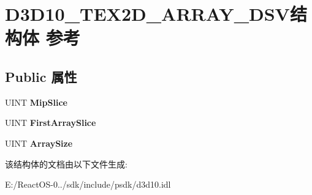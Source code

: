 \hypertarget{struct_d3_d10___t_e_x2_d___a_r_r_a_y___d_s_v}{}\section{D3\+D10\+\_\+\+T\+E\+X2\+D\+\_\+\+A\+R\+R\+A\+Y\+\_\+\+D\+S\+V结构体 参考}
\label{struct_d3_d10___t_e_x2_d___a_r_r_a_y___d_s_v}
\subsection*{Public 属性}
\begin{DoxyCompactItemize}
\item 
\mbox{\label{struct_d3_d10___t_e_x2_d___a_r_r_a_y___d_s_v_a891bd72fda2b4406118d3fc9b1de26d7}} 
U\+I\+NT {\bfseries Mip\+Slice}
\item 
\mbox{\label{struct_d3_d10___t_e_x2_d___a_r_r_a_y___d_s_v_a4c6f72c108f9551a0f9860fd73bb355a}} 
U\+I\+NT {\bfseries First\+Array\+Slice}
\item 
\mbox{\label{struct_d3_d10___t_e_x2_d___a_r_r_a_y___d_s_v_a3fd55fce366f36ea1d2205a9b49fcfd4}} 
U\+I\+NT {\bfseries Array\+Size}
\end{DoxyCompactItemize}


该结构体的文档由以下文件生成\+:\begin{DoxyCompactItemize}
\item 
E\+:/\+React\+O\+S-\/0../sdk/include/psdk/d3d10.\+idl\end{DoxyCompactItemize}
